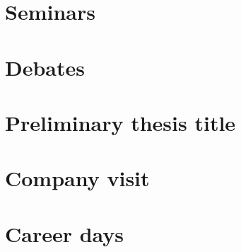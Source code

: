 \documentclass[11pt, a4paper, openany]{report}
\begin{document}


\tableofcontents
\clearpage


\chapter{Seminars}









\chapter{Debates}





\chapter{Preliminary thesis title}


\chapter{Company visit}


\chapter{Career days}

\end{document}
